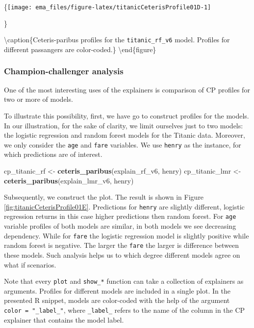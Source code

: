 \documentclass[12pt,]{krantz}
\newenvironment{Shaded}{\begin{snugshade}}{\end{snugshade}}
\newcommand{\KeywordTok}[1]{\textcolor[rgb]{0.13,0.29,0.53}{\textbf{#1}}}
\newcommand{\NormalTok}[1]{#1}
\newcommand{\StringTok}[1]{\textcolor[rgb]{0.31,0.60,0.02}{#1}}
\begin{document}
\{\centering \texttt{[image: ema\_files/figure-latex/titanicCeterisProfile01D-1]}

\}

\textbackslash{}caption\{Ceteris-paribus profiles for the \texttt{titanic\_rf\_v6} model. Profiles for different passangers are color-coded.\}\label{fig:titanicCeterisProfile01D}
\textbackslash{}end\{figure\}

\hypertarget{champion-challenger-analysis}{%
\subsubsection{Champion-challenger analysis}\label{champion-challenger-analysis}}

One of the most interesting uses of the explainers is comparison of CP profiles for two or more of models.

To illustrate this possibility, first, we have go to construct profiles for the models. In our illustration, for the sake of clarity, we limit ourselves just to two models: the logistic regression and random forest models for the Titanic data. Moreover, we only consider the \texttt{age} and \texttt{fare} variables. We use \texttt{henry} as the instance, for which predictions are of interest.

\begin{Shaded}
\begin{Highlighting}[]
\NormalTok{cp_titanic_rf <-}\StringTok{ }\KeywordTok{ceteris_paribus}\NormalTok{(explain_rf_v6, henry)}
\NormalTok{cp_titanic_lmr <-}\StringTok{ }\KeywordTok{ceteris_paribus}\NormalTok{(explain_lmr_v6, henry)}
\end{Highlighting}
\end{Shaded}

Subsequently, we construct the plot. The result is shown in Figure \ref{fig:titanicCeterisProfile01E}. Predictions for \texttt{henry} are slightly different, logistic regression returns in this case higher predictions then random forest. For \texttt{age} variable profiles of both models are similar, in both models we see decreasing dependency. While for \texttt{fare} the logistic regression model is slightly positive while random forest is negative. The larger the \texttt{fare} the larger is difference between these models. Such analysis helps us to which degree different models agree on what if scenarios.

Note that every \texttt{plot} and \texttt{show\_*} function can take a collection of explainers as arguments. Profiles for different models are included in a single plot. In the presented R snippet, models are color-coded with the help of the argument \texttt{color\ =\ "\_label\_"}, where \texttt{\_label\_} refers to the name of the column in the CP explainer that contains the model label.
\end{document}
